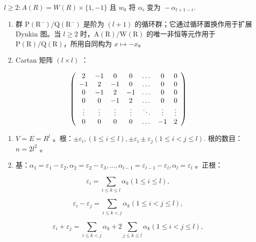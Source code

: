 \(l \geqslant 2: A(R) = W(R) \times \{1, -1\} \text{ 且 } w_{0} \text{ 将 } \alpha_{i} \text{ 变为 } -\alpha_{l+1-i}.\)

\begin{enumerate}
\def\labelenumi{(\Roman{enumi})}
\setcounter{enumi}{11}
\item
  群 \(\mathrm{P}(\mathrm{R}^{-})/\mathrm{Q}(\mathrm{R}^{-})\) 是阶为 \((l+1)\) 的循环群；它通过循环置换作用于扩展 Dynkin 图。当 \(l \geqslant 2\) 时，\(\mathrm{A}(\mathrm{R})/\mathrm{W}(\mathrm{R})\) 的唯一非恒等元作用于 \(\mathrm{P}(\mathrm{R})/\mathrm{Q}(\mathrm{R})\)，所用自同构为 \(x \mapsto -x\)。
\item
  Cartan 矩阵 \((l \times l)\) ：
\end{enumerate}

\[
\left( \begin{array}{c c c c c c c} 2 & - 1 & 0 & 0 & \dots & 0 & 0 \\ - 1 & 2 & - 1 & 0 & \dots & 0 & 0 \\ 0 & - 1 & 2 & - 1 & \dots & 0 & 0 \\ 0 & 0 & - 1 & 2 & \dots & 0 & 0 \\ \vdots & \vdots & \vdots & \vdots & \ddots & \vdots & \vdots \\ 0 & 0 & 0 & 0 & \dots & - 1 & 2 \end{array} \right)
\]


\begin{enumerate}
\def\labelenumi{(\Roman{enumi})}
\item
  \(V = E = R^{l}\) 。根：\(\pm\varepsilon_{i}, (1\leqslant i\leqslant l), \pm\varepsilon_{i}\pm\varepsilon_{j} (1\leqslant i<j\leqslant l).\) 根的数目：\(n = 2l^{2}\) 。
\item
  基：\(\alpha_{1} = \varepsilon_{1} - \varepsilon_{2},\alpha_{2} = \varepsilon_{2} - \varepsilon_{3},\ldots ,\alpha_{l - 1} = \varepsilon_{l - 1} - \varepsilon_{l},\alpha_{l} = \varepsilon_{l}\) 。正根：
\end{enumerate}

\[
\varepsilon_ {i} = \sum_ {i \leqslant k \leqslant l} \alpha_ {k} (1 \leqslant i \leqslant l),
\]

\[
\varepsilon_ {i} - \varepsilon_ {j} = \sum_ {i \leqslant k <   j} \alpha_ {k} (1 \leqslant i <   j \leqslant l),
\]

\[
\varepsilon_ {i} + \varepsilon_ {j} = \sum_ {i \leqslant k <   j} \alpha_ {k} + 2 \sum_ {j \leqslant k \leqslant l} \alpha_ {k} (1 \leqslant i <   j \leqslant l),
\]

